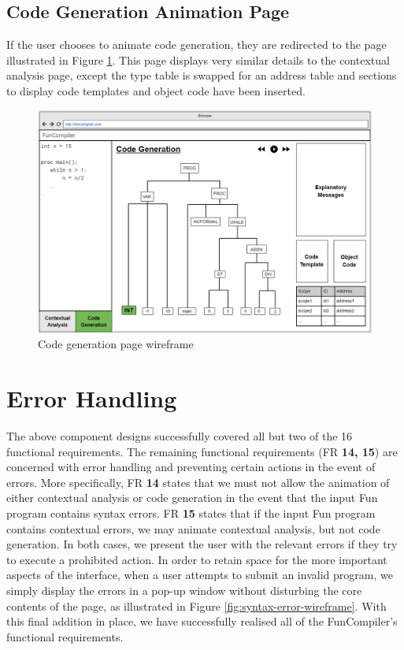 \documentclass{l4proj}
\begin{document}
\subsection{Code Generation Animation Page}
If the user chooses to animate code generation, they are redirected to the page illustrated in Figure \ref{fig:full3}. This page displays very similar details to the contextual analysis page, except the type table is swapped for an address table and sections to display code templates and object code have been inserted.

 \begin{figure}[h]
\centering
\includegraphics[scale=0.4]{images/full3.png}
\caption{Code generation page wireframe}
\label{fig:full3}	
\end{figure}

\section{Error Handling}
The above component designs successfully covered all but two of the 16 functional requirements. The remaining functional requirements (FR \textbf{14, 15}) are concerned with error handling and preventing certain actions in the event of errors. More specifically, FR \textbf{14} states that we must not allow the animation of either contextual analysis or code generation in the event that the input Fun program contains syntax errors. FR \textbf{15} states that if the input Fun program contains contextual errors, we may animate contextual analysis, but not code generation. In both cases, we present the user with the relevant errors if they try to execute a prohibited action. In order to retain space for the more important aspects of the interface, when a user attempts to submit an invalid program, we simply display the errors in a pop-up window without disturbing the core contents of the page, as illustrated in Figure \ref{fig:syntax-error-wireframe}. With this final addition in place, we have successfully realised all of the FunCompiler's functional requirements.
\end{document}
